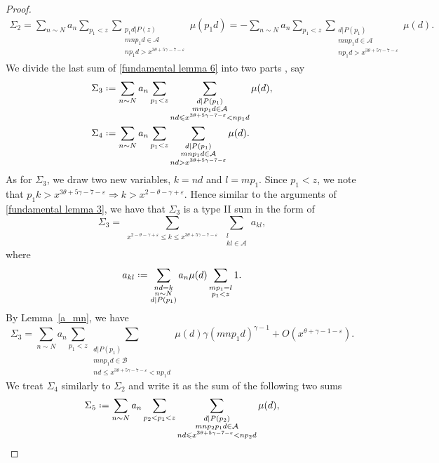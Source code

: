 \documentclass[10pt,a4paper]{amsart}
\newcommand{\cA}{\ensuremath{\mathcal{A}}}
\newcommand{\cB}{\ensuremath{\mathcal{B}}}
\newcommand*{\defeq}{\mathrel{\vcenter{\baselineskip0.5ex \lineskiplimit0pt
			\hbox{\scriptsize.}\hbox{\scriptsize.}}}%
	=}
\begin{document}
\begin{proof}
\begin{align}\label{fundamental lemma 6}
\Sigma_2 = \sum_{n \sim N} a_n \sum_{p_1 < z} \sum_{\substack{p_1d|P(z) \\ mnp_1d \in \cA \\ np_1d > x^{3\theta+5\gamma-7-\varepsilon}}} \mu(p_1d) = - \sum_{n \sim N}a_n \sum_{p_1 < z} \sum_{\substack{d|P(p_1) \\ mnp_1d \in \cA \\ np_1d > x^{3\theta+5\gamma-7-\varepsilon}}} \mu(d).
\end{align}
We divide the last sum of \eqref{fundamental lemma 6} into two parts , say
\begin{align*}
&\Sigma_3 \defeq \sum_{n \sim N}a_n \sum_{p_1 < z} \sum_{\substack{d|P(p_1) \\ mnp_1d \in \cA \\ nd \leqslant x^{3\theta+5\gamma-7-\varepsilon} < np_1d}} \mu(d) , \\
&\Sigma_4 \defeq \sum_{n \sim N}a_n \sum_{p_1 < z} \sum_{\substack{d|P(p_1) \\ mnp_1d \in \cA \\ nd > x^{3\theta+5\gamma-7-\varepsilon}}} \mu(d).
\end{align*}
As for $\Sigma_3$, we draw two new variables, $k = nd$ and $l=mp_1$. Since $p_1 < z$, we note that $p_1k > x^{3\theta+5\gamma-7-\varepsilon} \Rightarrow k > x^{2 - \theta - \gamma +\varepsilon}.$ Hence similar to the arguments of \eqref{fundamental lemma 3}, we have that $\Sigma_3$ is a type II sum in the form of 
$$
\Sigma_3 = \sum_{\substack{ x^{2-\theta -\gamma + \varepsilon} \leqslant k \leqslant x^{3\theta+5\gamma-7-\varepsilon}}} \sum_{\substack{ l \\ kl\in \cA}} a_{kl},
$$ 
where 
$$
a_{kl} \defeq  \sum_{\substack{ nd = k \\ n \sim N \\ d|P(p_1)}} a_n \mu(d)\sum_{\substack{mp_1 = l \\ p_1 < z}}1.
$$
By Lemma~\ref{a_mn}, we have
$$
\Sigma_3 = \sum_{n \sim N}a_n \sum_{p_1 < z} \sum_{\substack{d|P(p_1) \\ mnp_1d \in \cB \\ nd \leqslant x^{3\theta+5\gamma-7-\varepsilon} < np_1d}} \mu(d) \gamma (mnp_1d)^{\gamma-1} + O(x^{\theta + \gamma - 1 - \varepsilon}).
$$
We treat $\Sigma_4$ similarly to $\Sigma_2$ and write it as the sum of the following two sums
\begin{align*}
&\Sigma_5 \defeq \sum_{n \sim N}a_n \sum_{p_2 < p_1 < z} \sum_{\substack{d|P(p_2) \\ mnp_2p_1d \in \cA \\ nd \leqslant x^{3\theta+5\gamma-7-\varepsilon} < np_2d}} \mu(d) , \\

\end{align*}
\end{proof}
\end{document}
